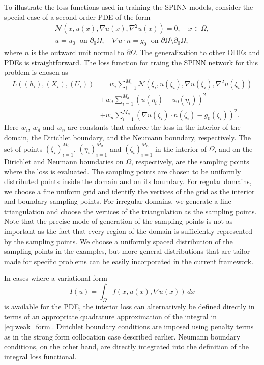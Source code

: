 \documentclass[12pt]{article}
\newcommand{\rb}[1]{#1}
\begin{document}
To illustrate the loss functions used in training the SPINN models, consider the special case of a second order PDE of the form
\begin{displaymath}
\begin{split}
\mathcal{N}(x, u(x), \nabla u(x), \nabla^2 u(x)) = 0, \quad x \in \Omega,\\
u = u_0 \;\text{ on }\partial_0 \Omega, \quad \nabla u \cdot n = g_0 \;\text{ on } \partial \Omega \setminus \partial_0 \Omega,
\end{split}
\end{displaymath}
where $n$ is the outward unit normal to $\partial \Omega$. The generalization to other ODEs and PDEs is straightforward. The loss function for traing the SPINN network for this problem is chosen as
\begin{equation} \label{eq:spinn_loss}
\begin{split}
L((h_i), (X_i), (U_i)) &= w_i \sum_{i=1}^{M_i} \mathcal{N}(\xi_i, u(\xi_i), \nabla u(\xi_i), \nabla^2 u(\xi_i))\\
 &+ w_d \sum_{i=1}^{M_d} (u(\eta_i) - u_0(\eta_i))^2\\
 &+ w_n \sum_{i=1}^{M_n} \left(\nabla u(\zeta_i)\cdot n(\zeta_i) - g_0(\zeta_i)\right)^2.
\end{split}
\end{equation}
Here $w_i$, $w_d$ and $w_n$ are constants that enforce the loss in the interior of the domain, the Dirichlet boundary, and the Neumann boundary, respectively. The set of points $(\xi_i)_{i=1}^{M_i}$, $(\eta_i)_{i=1}^{M_d}$ and $(\zeta_i)_{i=1}^{M_n}$ in the interior of $\Omega$, and on the Dirichlet and Neumann boundaries on $\Omega$, respectively, are the sampling points where the loss is evaluated. \rb{The sampling points are chosen to be uniformly distributed points inside the domain and on its boundary. For regular domains, we choose a fine uniform grid and identify the vertices of the grid as the interior and boundary sampling points. For irregular domains, we generate a fine triangulation and choose the vertices of the triangulation as the sampling points. Note that the precise mode of generation of the sampling points is not as important as the fact that every region of the domain is sufficiently represented by the sampling points.  We choose a uniformly spaced distribution of the sampling points in the examples, but more general distributions that are tailor made for specific problems can be easily incorporated in the current framework.}

In cases where a variational form
\begin{equation} \label{eq:weak_form}
I(u) = \int_{\Omega} f(x, u(x), \nabla u(x))\,dx
\end{equation}
is available for the PDE, the interior loss can alternatively be defined directly in terms of an appropriate quadrature approximation of the integral in \eqref{eq:weak_form}. Dirichlet boundary conditions are imposed using penalty terms as in the strong form collocation case described earlier. Neumann boundary conditions, on the other hand, are directly integrated into the definition of the integral loss functional.
\end{document}
